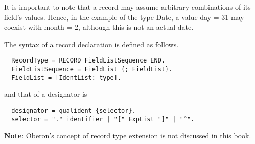 It is important to note that a record may assume arbitrary combinations of its field's values. Hence,
in the example of the type Date, a value day = 31 may coexist with month = 2, although this is not
an actual date.

The syntax of a record declaration is defined as follows.
\begin{verbatim}
  RecordType = RECORD FieldListSequence END.
  FieldListSequence = FieldList {; FieldList}.
  FieldList = [IdentList: type].
\end{verbatim}
and that of a designator is
\begin{verbatim}
  designator = qualident {selector}.
  selector = "." identifier | "[" ExpList "]" | "^".
\end{verbatim}
\textbf{Note}: Oberon’s concept of record type extension is not discussed in this book.
